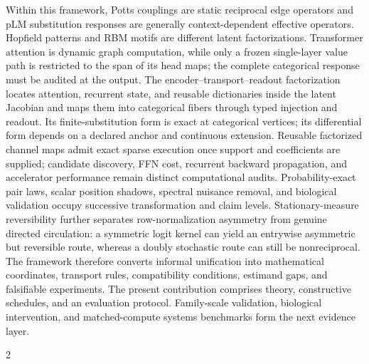 \documentclass[10pt]{article}
\theoremstyle{definition}
\theoremstyle{remark}
\newcommand{\BookBackMatter}{}
\newcommand{\BookAppendices}{}
\newcommand{\BookBibliographyColumnsBegin}{\begin{multicols}{2}}
\newcommand{\BookBibliographyColumnsEnd}{\end{multicols}}
\newcommand{\BookBibliographySize}{\scriptsize}
\newcommand{\BookBibliographyDatabase}{}
\newcommand{\BookInsert}[1]{}
\newcommand{\BookOnlyChapter}[1]{}
\newcommand{\BookChapterLabel}[1]{}
\begin{document}
Within this framework, Potts couplings are static reciprocal edge operators and pLM substitution
responses are generally context-dependent effective operators.  Hopfield patterns and RBM motifs
are different latent factorizations.  Transformer attention is dynamic graph computation, while
only a frozen single-layer value path is restricted to the span of its head maps; the complete
categorical response must be audited at the output.  The encoder--transport--readout factorization
locates attention, recurrent state, and reusable dictionaries inside the latent Jacobian and maps
them into categorical fibers through typed injection and readout.  Its finite-substitution form is
exact at categorical vertices; its differential form depends on a declared anchor and continuous
extension.  Reusable factorized channel maps admit exact sparse execution once support and
coefficients are supplied; candidate discovery, FFN cost,
recurrent backward propagation, and accelerator performance remain distinct computational audits.
Probability-exact pair laws, scalar position
shadows, spectral nuisance removal, and biological validation occupy successive transformation and
claim levels.  Stationary-measure reversibility further
separates row-normalization asymmetry from genuine directed circulation: a symmetric logit kernel
can yield an entrywise asymmetric but reversible route, whereas a doubly stochastic route can
still be nonreciprocal.  The framework therefore converts informal
unification into mathematical coordinates, transport rules, compatibility conditions, estimand
gaps, and falsifiable experiments.  The present contribution comprises theory, constructive
schedules, and an evaluation protocol.  Family-scale validation, biological intervention, and
matched-compute systems benchmarks form the next evidence layer.

\fi
\BookAppendices
\BookOnlyChapter{Population Selection as an Optional Bridge}
\BookChapterLabel{app:book-population-selection}
\BookInsert{chapters/appendix_population_selection}
\BookBackMatter
\BookBibliographySize
\BookBibliographyColumnsBegin
\raggedcolumns

\BookBibliographyDatabase
\BookBibliographyColumnsEnd

\ifdefined\BOOKMODE
\else
\end{document}
